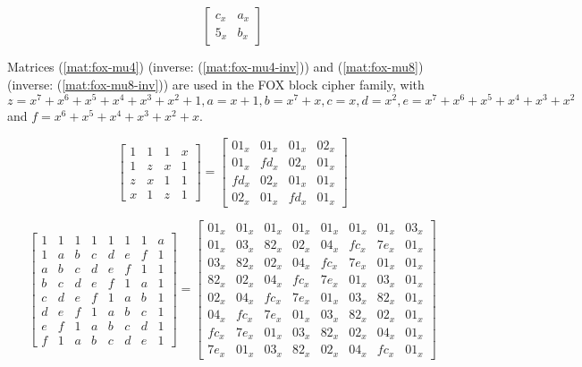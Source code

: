 \documentclass{report}
\begin{document}
\begin{equation}\label{mat:hierocrypt-l1-higher-inv}
\begin{bmatrix}
c_x & a_x\\
5_x & b_x
\end{bmatrix}
\end{equation}

Matrices (\ref{mat:fox-mu4}) (inverse: (\ref{mat:fox-mu4-inv})) and (\ref{mat:fox-mu8}) (inverse: (\ref{mat:fox-mu8-inv})) are used in the FOX block cipher family, with $z = x^7+x^6+x^5+x^4+x^3+x^2+1, a = x+1, b = x^7+x, c = x, d = x^2, e = x^7+x^6+x^5+x^4+x^3+x^2$ and $f = x^6+x^5+x^4+x^3+x^2+x$.

\begin{equation}\label{mat:fox-mu4}
\begin{bmatrix}
1 & 1 & 1 & x\\
1 & z & x & 1\\
z & x & 1 & 1\\
x & 1 & z & 1
\end{bmatrix}
=
\begin{bmatrix}
01_x & 01_x & 01_x & 02_x\\
01_x & fd_x & 02_x & 01_x\\
fd_x & 02_x & 01_x & 01_x\\
02_x & 01_x & fd_x & 01_x
\end{bmatrix}
\end{equation}

\begin{equation}\label{mat:fox-mu8}
\begin{bmatrix}
1 & 1 & 1 & 1 & 1 & 1 & 1 & a\\
1 & a & b & c & d & e & f & 1\\
a & b & c & d & e & f & 1 & 1\\
b & c & d & e & f & 1 & a & 1\\
c & d & e & f & 1 & a & b & 1\\
d & e & f & 1 & a & b & c & 1\\
e & f & 1 & a & b & c & d & 1\\
f & 1 & a & b & c & d & e & 1
\end{bmatrix}
=
\begin{bmatrix}
01_x & 01_x & 01_x & 01_x & 01_x & 01_x & 01_x & 03_x\\
01_x & 03_x & 82_x & 02_x & 04_x & fc_x & 7e_x & 01_x\\
03_x & 82_x & 02_x & 04_x & fc_x & 7e_x & 01_x & 01_x\\
82_x & 02_x & 04_x & fc_x & 7e_x & 01_x & 03_x & 01_x\\
02_x & 04_x & fc_x & 7e_x & 01_x & 03_x & 82_x & 01_x\\
04_x & fc_x & 7e_x & 01_x & 03_x & 82_x & 02_x & 01_x\\
fc_x & 7e_x & 01_x & 03_x & 82_x & 02_x & 04_x & 01_x\\
7e_x & 01_x & 03_x & 82_x & 02_x & 04_x & fc_x & 01_x
\end{bmatrix}
\end{equation}
\end{document}
